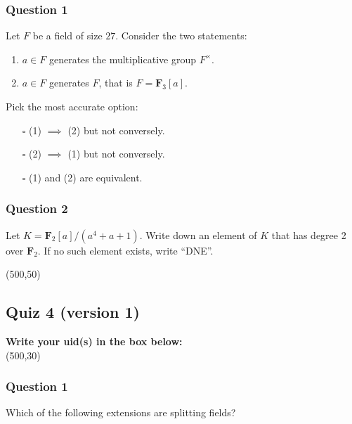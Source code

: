 \documentclass[11pt]{article}
\begin{document}
\subsubsection{Question 1}
\label{sec:orgaed437a}

Let \(F\) be a field of size \(27\).  Consider the two statements:
\begin{enumerate}
\item \(a \in F\) generates the multiplicative group \(F^{\times}\).
\item \(a \in F\) generates \(F\), that is \(F = \mathbf{F}_3[a]\).
\end{enumerate}

Pick the most accurate option:\\

\begin{itemize}
\item[{$\square$}] (1) \(\implies\) (2) but not conversely.\\

\item[{$\square$}] (2) \(\implies\) (1) but not conversely.\\

\item[{$\square$}] (1) and (2) are equivalent.
\end{itemize}
\subsubsection{Question 2}
\label{sec:org17accd1}

Let \(K = \mathbf{F}_2[a]/(a^4+a+1)\).
Write down an element of \(K\) that has degree 2 over \(\mathbf{F}_2\).
If no such element exists, write ``DNE''.

\noindent
\framebox(500,50)

\vspace{3cm}
\subsection{Quiz 4 (version 1)}
\label{sec:org94caeff}
\vspace{1cm}

\noindent
\textbf{Write your uid(s) in the box below:}\\
\framebox(500,30)

\vspace{1cm}
\subsubsection{Question 1}
\label{sec:org64751c7}
Which of the following extensions are splitting fields?
\end{document}
